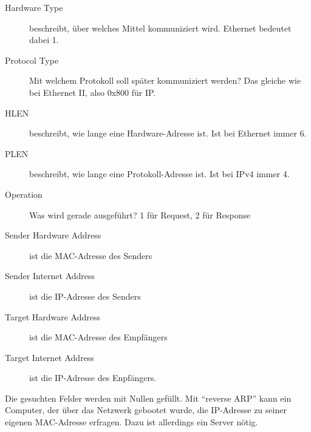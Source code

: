 \documentclass[a4paper,10pt]{scrartcl}
\begin{document}
        \begin{description}
            \item[Hardware Type] beschreibt, über welches Mittel kommuniziert wird. Ethernet bedeutet dabei 1.
            \item[Protocol Type] Mit welchem Protokoll soll später kommuniziert werden? Das gleiche wie bei Ethernet II, also 0x800 für IP.
            \item[HLEN] beschreibt, wie lange eine Hardware-Adresse ist. Ist bei Ethernet immer 6.
            \item[PLEN] beschreibt, wie lange eine Protokoll-Adresse ist. Ist bei IPv4 immer 4.
            \item[Operation] Was wird gerade ausgeführt? 1 für Request, 2 für Response
            \item[Sender Hardware Address] ist die MAC-Adresse des Senders
            \item[Sender Internet Address] ist die IP-Adresse des Senders
            \item[Target Hardware Address] ist die MAC-Adresse des Empfängers
            \item[Target Internet Address] ist die IP-Adresse des Enpfängers.
        \end{description}
        Die gesuchten Felder werden mit Nullen gefüllt. Mit “reverse ARP” kann ein Computer, der über das Netzwerk gebootet wurde, die IP-Adresse zu seiner eigenen MAC-Adresse erfragen. Dazu ist allerdings ein Server nötig.
\end{document}
